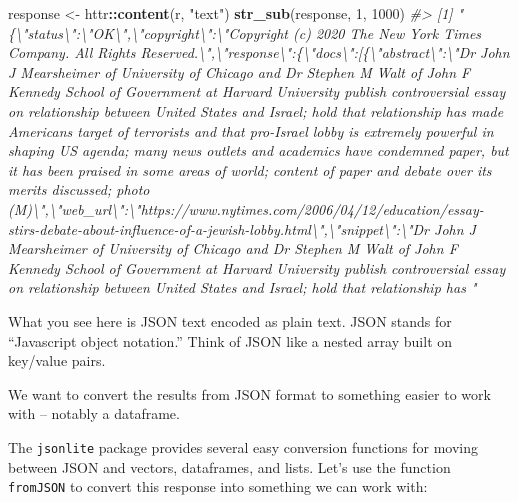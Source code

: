 \documentclass[
]{book}
\newenvironment{Shaded}{\begin{snugshade}}{\end{snugshade}}
\newcommand{\CommentTok}[1]{\textcolor[rgb]{0.56,0.35,0.01}{\textit{#1}}}
\newcommand{\DecValTok}[1]{\textcolor[rgb]{0.00,0.00,0.81}{#1}}
\newcommand{\KeywordTok}[1]{\textcolor[rgb]{0.13,0.29,0.53}{\textbf{#1}}}
\newcommand{\NormalTok}[1]{#1}
\newcommand{\OperatorTok}[1]{\textcolor[rgb]{0.81,0.36,0.00}{\textbf{#1}}}
\newcommand{\StringTok}[1]{\textcolor[rgb]{0.31,0.60,0.02}{#1}}
\begin{document}
\begin{Shaded}
\begin{Highlighting}[]
\NormalTok{response <-}\StringTok{ }\NormalTok{httr}\OperatorTok{::}\KeywordTok{content}\NormalTok{(r, }\StringTok{"text"}\NormalTok{)}
\KeywordTok{str_sub}\NormalTok{(response, }\DecValTok{1}\NormalTok{, }\DecValTok{1000}\NormalTok{)}
\CommentTok{#> [1] "\{\textbackslash{}"status\textbackslash{}":\textbackslash{}"OK\textbackslash{}",\textbackslash{}"copyright\textbackslash{}":\textbackslash{}"Copyright (c) 2020 The New York Times Company. All Rights Reserved.\textbackslash{}",\textbackslash{}"response\textbackslash{}":\{\textbackslash{}"docs\textbackslash{}":[\{\textbackslash{}"abstract\textbackslash{}":\textbackslash{}"Dr John J Mearsheimer of University of Chicago and Dr Stephen M Walt of John F Kennedy School of Government at Harvard University publish controversial essay on relationship between United States and Israel; hold that relationship has made Americans target of terrorists and that pro-Israel lobby is extremely powerful in shaping US agenda; many news outlets and academics have condemned paper, but it has been praised in some areas of world; content of paper and debate over its merits discussed; photo (M)\textbackslash{}",\textbackslash{}"web_url\textbackslash{}":\textbackslash{}"https://www.nytimes.com/2006/04/12/education/essay-stirs-debate-about-influence-of-a-jewish-lobby.html\textbackslash{}",\textbackslash{}"snippet\textbackslash{}":\textbackslash{}"Dr John J Mearsheimer of University of Chicago and Dr Stephen M Walt of John F Kennedy School of Government at Harvard University publish controversial essay on relationship between United States and Israel; hold that relationship has "}
\end{Highlighting}
\end{Shaded}

What you see here is JSON text encoded as plain text. JSON stands for ``Javascript object notation.'' Think of JSON like a nested array built on key/value pairs.

We want to convert the results from JSON format to something easier to work with -- notably a dataframe.

The \texttt{jsonlite} package provides several easy conversion functions for moving between JSON and vectors, dataframes, and lists. Let's use the function \texttt{fromJSON} to convert this response into something we can work with:
\end{document}
